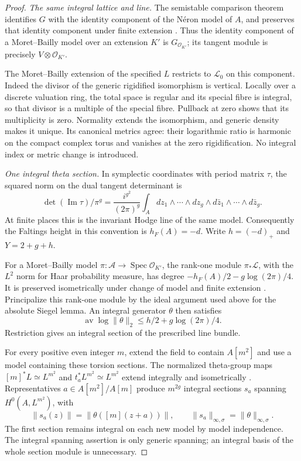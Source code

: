 \begin{proof}
\emph{The same integral lattice and line.}
The semistable comparison theorem identifies $G$ with the identity
component of the N\'eron model of $A$, and preserves that identity
component under finite extension
\cite[Theorem~4.4 and Corollary~4.5]{conrad-semistable}.
Thus the identity component of a Moret--Bailly model over an extension
$K'$ is $G_{\mathcal O_{K'}}$; its tangent module is precisely
$V\otimes\mathcal O_{K'}$.

The Moret--Bailly extension of the specified $L$ restricts to
$\mathcal L_0$ on this component. Indeed the divisor of the generic
rigidified isomorphism is vertical. Locally over a discrete valuation
ring, the total space is regular and its special fibre is integral,
so that divisor is a multiple of the special fibre. Pullback at zero
shows that its multiplicity is zero. Normality extends the isomorphism,
and generic density makes it unique. Its canonical metrics agree:
their logarithmic ratio is harmonic on the compact complex torus and
vanishes at the zero rigidification. No integral index or metric
change is introduced.

\emph{One integral theta section.}
In symplectic coordinates with period matrix $\tau$, the squared norm
on the dual tangent determinant is
\[
 \det(\operatorname{Im}\tau)/\pi^g
  =\frac{i^{g^2}}{(2\pi)^g}\int_A
        dz_1\wedge\cdots\wedge dz_g\wedge
        d\bar z_1\wedge\cdots\wedge d\bar z_g.
\]
At finite places this is the invariant Hodge line of the same model.
Consequently the Faltings height in this convention is $h_F(A)=-d$.
Write $h=(-d)_+$ and $Y=2+g+h$.

For a Moret--Bailly model $\pi:\mathcal A\to\operatorname{Spec}
\mathcal O_{K'}$, the rank-one module $\pi_*\mathcal L$, with the
$L^2$ norm for Haar probability measure, has degree
$-h_F(A)/2-g\log(2\pi)/4$. It is preserved isometrically under
change of model and finite extension
\cite[Definition~2.1 and Theorem~3.4(i),(iii)--(v)]{pazuki-theta-faltings}.
Principalize this rank-one module by the ideal argument used above
for the absolute Siegel lemma. An integral generator $\theta$ then
satisfies
\begin{equation}\label{geo-theta-ltwo-supplier}
 \operatorname{av}\log\|\theta\|_2
          \le h/2+g\log(2\pi)/4.
\end{equation}
Restriction gives an integral section of the prescribed line bundle.

For every positive even integer $m$, extend the field to contain
$A[m^2]$ and use a model containing these torsion sections. The normalized
theta-group maps $[m]^*L\simeq L^{m^2}$ and
$t_a^*L^{m^2}\simeq L^{m^2}$ extend integrally and isometrically
\cite[Propositions~2.5 and~5.1]{pazuki-theta-faltings}.
Representatives $a\in A[m^2]/A[m]$ produce $m^{2g}$ integral
sections $s_a$ spanning $H^0(A,L^{m^2})$, with
\[
 \|s_a(z)\|=\|\theta([m](z+a))\|,
 \qquad \|s_a\|_{\infty,\sigma}=\|\theta\|_{\infty,\sigma}.
\]
The first section remains integral on each new model by model
independence. The integral spanning assertion is only generic spanning;
an integral basis of the whole section module is unnecessary.


\end{proof}
